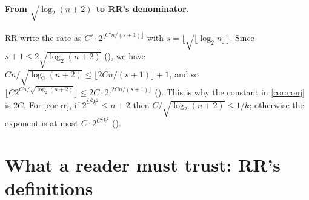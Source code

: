 \documentclass[10pt]{amsart}
\theoremstyle{plain}
\theoremstyle{definition}
\theoremstyle{remark}
\numberwithin{equation}{section}
\begin{document}
\paragraph{From $\sqrt{\log_2(n+2)}$ to RR's denominator.} RR write the rate as
$C'\cdot2^{\lfloor C'n/(s+1)\rfloor}$ with $s=\lfloor\sqrt{\lfloor\log_2n\rfloor}\rfloor$. Since
$s+1\le2\sqrt{\log_2(n+2)}$ (), we have
$Cn/\sqrt{\log_2(n+2)}\le\lfloor 2Cn/(s+1)\rfloor+1$, and so $\lfloor C2^{Cn/\sqrt{\log_2(n+2)}}\rfloor\le
2C\cdot2^{\lfloor2Cn/(s+1)\rfloor}$ (). This is why the constant in
\cref{cor:conj} is $2C$. For \cref{cor:rr}, if $2^{C^2k^2}\le n+2$ then $C/\sqrt{\log_2(n+2)}\le1/k$;
otherwise the exponent is at most $C\cdot2^{C^2k^2}$ ().

\section{What a reader must trust: RR's definitions}\label{sec:statement}
\end{document}
